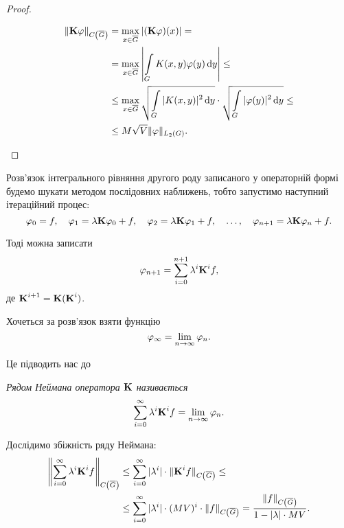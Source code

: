 \begin{proof}
\begin{enumerate}
		\begin{equation}
			\begin{aligned}
				\| \bf{K} \phi \|_{\CoG} &= \Max_{x \in \oG} |(\bf{K} \phi) (x)| = \\
				&= \Max_{x \in \oG} \left| \Int_G K(x, y) \phi(y) \diff y \right| \le \\
				&\le \Max_{x \in \oG} \sqrt{\Int_G |K(x, y)|^2 \diff y} \cdot \sqrt{\Int_G |\phi(y)|^2 \diff y} \le \\
				&\le M \sqrt{V} \|\phi\|_{L_2(G)}.
			\end{aligned}
		\end{equation}
	\end{enumerate}
\end{proof}

Розв'язок інтегрального рівняння другого роду записаного у операторній формі будемо шукати методом послідовних наближень, тобто запустимо наступний ітераційний процес:
\begin{equation}
	\phi_0 = f, \quad \phi_1 = \lambda \bf{K} \phi_0 + f, \quad \phi_2 = \lambda \bf{K} \phi_1 + f, \quad \ldots, \quad \phi_{n + 1} = \lambda \bf{K} \phi_n + f.
\end{equation}

Тоді можна записати
\begin{equation}
	\phi_{n + 1} = \Sum_{i = 0}^{n + 1} \lambda^i \bf{K}^i f,
\end{equation}
де
$\bf{K}^{i + 1} = \bf{K} (\bf{K}^i)$. \medskip

Хочеться за розв'язок взяти функцію
\begin{equation}
	\phi_\infty = \Lim_{n \to \infty} \phi_{n}.
\end{equation}

Це підводить нас до
\begin{definition}
	\it{Рядом Неймана} оператора $\bf{K}$ називається
	\begin{equation}
		\Sum_{i = 0}^\infty \lambda^i \bf{K}^i f = \Lim_{n \to \infty} \phi_{n}.
	\end{equation}
\end{definition}

Дослідимо збіжність ряду Неймана:
\begin{equation}
	\begin{aligned}
		\left\| \Sum_{i = 0}^\infty \lambda^i \bf{K}^i f \right\|_{\CoG} &\le \Sum_{i = 0}^\infty |\lambda^i| \cdot \| \bf{K}^i f \|_{\CoG} \le \\
		&\le \Sum_{i = 0}^\infty |\lambda^i| \cdot (MV)^i \cdot \| f \|_{\CoG} = \dfrac{\|f\|_{\CoG}}{1 - |\lambda| \cdot MV}.
	\end{aligned}
\end{equation}

